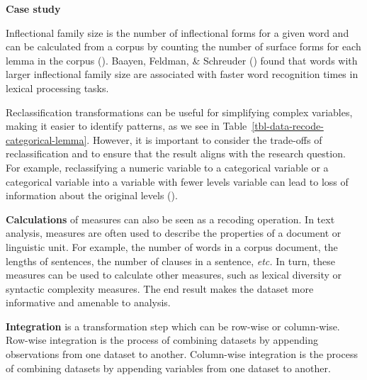 \documentclass[
  letterpaper,
  krantz1]{latex/krantz-mod}
\theoremstyle{definition}
\theoremstyle{definition}
\theoremstyle{remark}
\begin{document}
\begin{tcolorbox}[enhanced jigsaw, toprule=.15mm, breakable, colback=white, arc=.35mm, left=2mm, colframe=quarto-callout-color-frame, opacityback=0, bottomrule=.15mm, rightrule=.15mm, leftrule=.75mm]

\textbf{ Case study}

Inflectional family size is the number of inflectional
forms for a given word and can be
calculated from a corpus by counting the number of surface forms for
each lemma in the corpus (). Baayen, Feldman, \& Schreuder
() found that words with larger
inflectional family size are associated with faster word recognition
times in lexical processing
tasks.

\end{tcolorbox}

Reclassification transformations can be
useful for simplifying complex variables, making it easier to identify
patterns, as we see in Table~\ref{tbl-data-recode-categorical-lemma}.
However, it is important to consider the trade-offs of reclassification
and to ensure that the result aligns with the research question. For
example, reclassifying a numeric variable to
a categorical variable or a categorical variable into a variable with
fewer levels variable can lead to loss of information about the original
levels ().

\textbf{Calculations} of measures can also be
seen as a recoding operation. In text analysis,
measures are often used to describe the properties of a document or
linguistic unit. For example, the number of words in a
corpus document, the lengths of sentences, the number of clauses in a
sentence, \emph{etc.} In turn, these measures can be used to calculate
other measures, such as lexical diversity or
syntactic complexity measures. The end
result makes the dataset more informative and amenable to analysis.

\textbf{Integration} is a transformation
step which can be row-wise or column-wise. Row-wise integration is the
process of combining datasets by appending observations from one dataset
to another. Column-wise integration is the process of combining datasets
by appending variables from one dataset to another.
\end{document}
